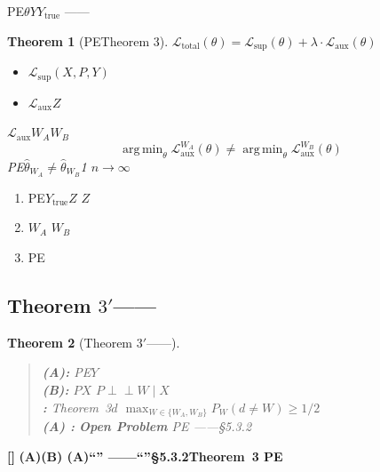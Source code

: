 \documentclass[11pt,a4paper]{article}
\newtheorem{theorem}{Theorem}[section]
\theoremstyle{remark}
\DeclareMathOperator*{\argmin}{arg\,min}
\newcommand{\indep}{\perp\!\!\!\perp}
\newcommand{\rigorous}{\textnormal{\textbf{[]}}}
\begin{document}
PE$\theta$$Y$$Y_{\text{true}}$
——

\begin{theorem}[PETheorem 3]
\label{thm:4.1}
$\mathcal{L}_{\text{total}}(\theta) = \mathcal{L}_{\text{sup}}(\theta)
+ \lambda \cdot \mathcal{L}_{\text{aux}}(\theta)$
\begin{itemize}
    \item $\mathcal{L}_{\text{sup}}$$(X, P, Y)$
    \item $\mathcal{L}_{\text{aux}}$$Z$
\end{itemize}
$\mathcal{L}_{\text{aux}}$$W_A$$W_B$
\begin{equation}
    \argmin_\theta \mathcal{L}_{\text{aux}}^{W_A}(\theta)
    \neq \argmin_\theta \mathcal{L}_{\text{aux}}^{W_B}(\theta)
\end{equation}
PE$\hat{\theta}_{W_A} \neq \hat{\theta}_{W_B}$1
$n \to \infty$\textbf{}
\end{theorem}

\textbf{}
\begin{enumerate}[label=(\roman*)]
    \item \textbf{}PE$Y_{\text{true}}$$Z$
          $Z$
    \item \textbf{}$W_A$
          $W_B$
    \item \textbf{}PE
\end{enumerate}

\subsection{Theorem $3'$——}

\begin{theorem}[Theorem $3'$——]
\label{thm:3'}
\begin{quote}
\textbf{ (A):} PE$Y$\\
\textbf{ (B):} $P$$X$
$P \indep W \mid X$\\
\textbf{:} Theorem~3$d$
$\max_{W \in \{W_A, W_B\}} P_W(d \neq W) \geq 1/2$\\
\textbf{ (A) :} \textbf{Open Problem}
PE
——\S5.3.2
\end{quote}
\end{theorem}

\rigorous{} \textbf{(A)(B)
(A)``''
——``''\S5.3.2Theorem~3
PE
}

\subsection{}
\label{sec:4.3}
\end{document}
